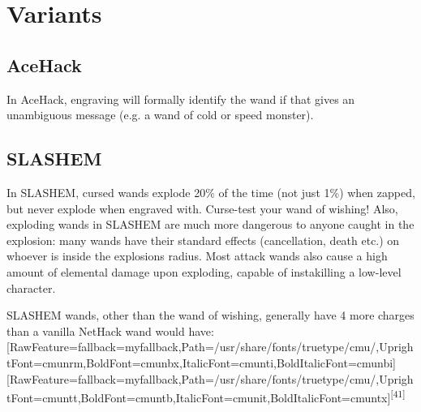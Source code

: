 \section{Variants}
\label{17}
\subsection{AceHack}
\label{18}
In AceHack\footnotemark[187], engraving will formally identify the wand if that gives an unambiguous message (e.g. a wand of cold or speed monster).



\subsection{SLASH\textquotesingle{}EM}
\label{19}
In SLASH\textquotesingle{}EM\footnotemark[188], cursed wands explode 20\% of the time (not just 1\%) when zapped, but never explode when engraved with. Curse-{}test your wand of wishing\footnotemark[189]! Also, exploding wands in SLASH\textquotesingle{}EM are much more dangerous to anyone caught in the explosion: many wands have their standard effects (cancellation, death etc.) on whoever is inside the explosion\textquotesingle{}s radius. Most attack wands also cause a high amount of elemental damage upon exploding, capable of instakilling a low-{}level character.


SLASH\textquotesingle{}EM wands, other than the wand of wishing\footnotemark[190], generally have 4 more charges than a vanilla NetHack wand would have: \allowbreak{}\setmainfont{cmunrm.ttf}[RawFeature={fallback=myfallback},Path=/usr/share/fonts/truetype/cmu/,UprightFont=cmunrm,BoldFont=cmunbx,ItalicFont=cmunti,BoldItalicFont=cmunbi]\setmonofont{cmunrm.ttf}[RawFeature={fallback=myfallback},Path=/usr/share/fonts/truetype/cmu/,UprightFont=cmuntt,BoldFont=cmuntb,ItalicFont=cmunit,BoldItalicFont=cmuntx]\textsuperscript{{$\text{[}$}41{$\text{]}$}}




